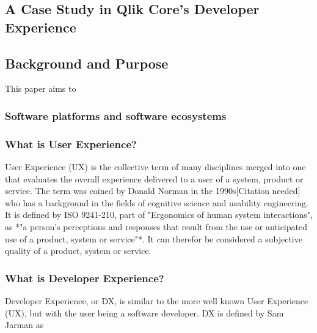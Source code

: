 \documentclass[11pt]{article}
\begin{document}
\begin{multicols}{2}

        \section{A Case Study in Qlik Core's Developer Experience}

        \subsection{Background and Purpose}

        This paper aims to

        \subsubsection{Software platforms and software ecosystems}


        \subsubsection{What is User Experience?}

        User Experience (UX) is the collective term of many disciplines merged
        into one that evaluates the overall experience delivered to a user of a
        system, product or service. The term was coined by Donald Norman in the
        1990s[Citation needed] who has a background in the fields of cognitive
        science and usability engineering. It is defined by ISO 9241-210, part
        of "Ergonomics of human system interactions", as *"a person's
        perceptions and responses that result from the use or anticipated use of
        a product, system or service"*. It can therefor be considered a
        subjective quality of a product, system or service.


        \subsubsection{What is Developer Experience?}

        Developer Experience, or DX, is similar to the more well known User
        Experience (UX), but with the user being a software developer. DX is
        defined by Sam Jarman as


\end{multicols}
\end{document}

